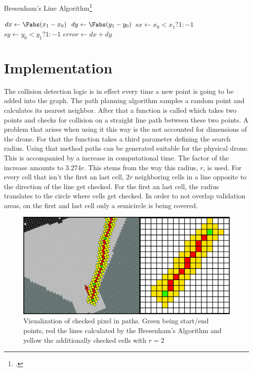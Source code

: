 \begin{algorithm}[]
	\caption{Bresenham's Line Algorithm\footcite{Zingl2012}}
	$dx \gets \Fabs(x_1-x_0)$\;
	$dy \gets \Fabs(y_1-y_0)$\;
	$sx \gets x_0<x_1 ? 1 : -1$\;
	$sy \gets y_0<y_1 ? 1 : -1$\;
	$error \gets dx + dy$\;
\end{algorithm}



\section{Implementation}
The collision detection logic is in effect every time a new point is going to be added into the graph. The path planning algorithm samples a random point and calculates its nearest neighbor. After that a function is called which takes two points and checks for collision on a straight line path between these two points.\newline
A problem that arises when using it this way is the not accounted for dimensions of the drone. For that the function takes a third parameter defining the search radius. Using that method paths can be generated suitable for the physical drone. This is accompanied by a increase in computational time. The factor of the increase amounts to $3.274r$. This stems from the way this radius, $r$, is used. For every cell that isn't the first an last cell, $2r$ neighboring cells in a line opposite to the direction of the line get checked. For the first an last cell, the radius translates to the circle where cells get checked. In order to not overlap validation areas, on the first and last cell only a semicircle is being covered. 

\begin{figure}[h]
	\centering
	\includegraphics[width=0.8\linewidth]{img/CheckedPixels}
	\caption{Visualization of checked pixel in paths. Green being start/end points, red the lines calculated by the Bresenham's Algorithm and yellow the additionally checked cells with $r = 2$}
	\label{fig:collision_detection_checkedPixels}
\end{figure}

